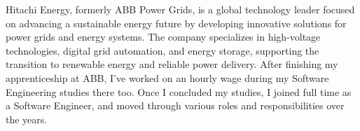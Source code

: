 
{
}


\begin{cvparagraph}
	{	}
	{
		Hitachi Energy, formerly ABB Power Grids, is a global technology leader focused on advancing a sustainable energy future by developing innovative solutions for power grids and energy systems. The company specializes in high-voltage technologies, digital grid automation, and energy storage, supporting the transition to renewable energy and reliable power delivery. \newline
		After finishing my apprenticeship at ABB, I've worked on an hourly wage during my Software Engineering studies there too. Once I concluded my studies, I joined full time as a Software Engineer, and moved through various roles and responsibilities over the years.
}
\end{cvparagraph}

